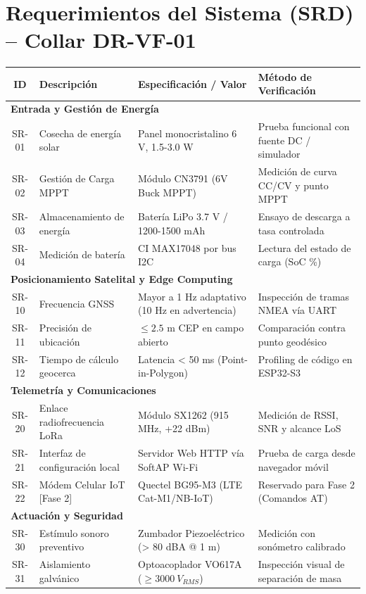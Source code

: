 \section*{Requerimientos del Sistema (SRD) -- Collar DR-VF-01}

\begin{table}[H]
\centering
\small
\begin{tabularx}{\textwidth}{|c X X X|}
\hline
\rowcolor{categorybg}
\textbf{ID} & \textbf{Descripción} & \textbf{Especificación / Valor} & \textbf{Método de Verificación} \\ \hline
\multicolumn{4}{|l|}{\cellcolor{categorybgsub}\textbf{Entrada y Gestión de Energía}} \\ \hline
SR-01 & Cosecha de energía solar & Panel monocristalino 6 V, 1.5-3.0 W & Prueba funcional con fuente DC / simulador \\ \hline
SR-02 & Gestión de Carga MPPT & Módulo CN3791 (6V Buck MPPT) & Medición de curva CC/CV y punto MPPT \\ \hline
SR-03 & Almacenamiento de energía & Batería LiPo 3.7 V / 1200-1500 mAh & Ensayo de descarga a tasa controlada \\ \hline
SR-04 & Medición de batería & CI MAX17048 por bus I2C & Lectura del estado de carga (SoC \%) \\ \hline
\multicolumn{4}{|l|}{\cellcolor{categorybgsub}\textbf{Posicionamiento Satelital y Edge Computing}} \\ \hline
SR-10 & Frecuencia GNSS & Mayor a 1 Hz adaptativo (10 Hz en advertencia) & Inspección de tramas NMEA vía UART \\ \hline
SR-11 & Precisión de ubicación & $\le 2.5$ m CEP en campo abierto & Comparación contra punto geodésico \\ \hline
SR-12 & Tiempo de cálculo geocerca & Latencia < 50 ms (Point-in-Polygon) & Profiling de código en ESP32-S3 \\ \hline
\multicolumn{4}{|l|}{\cellcolor{categorybgsub}\textbf{Telemetría y Comunicaciones}} \\ \hline
SR-20 & Enlace radiofrecuencia LoRa & Módulo SX1262 (915 MHz, +22 dBm) & Medición de RSSI, SNR y alcance LoS \\ \hline
SR-21 & Interfaz de configuración local & Servidor Web HTTP vía SoftAP Wi-Fi & Prueba de carga desde navegador móvil \\ \hline
SR-22 & Módem Celular IoT [Fase 2] & Quectel BG95-M3 (LTE Cat-M1/NB-IoT) & Reservado para Fase 2 (Comandos AT) \\ \hline
\multicolumn{4}{|l|}{\cellcolor{categorybgsub}\textbf{Actuación y Seguridad}} \\ \hline
SR-30 & Estímulo sonoro preventivo & Zumbador Piezoeléctrico (> 80 dBA @ 1 m) & Medición con sonómetro calibrado \\ \hline
SR-31 & Aislamiento galvánico & Optoacoplador VO617A ($\ge 3000~V_{RMS}$) & Inspección visual de separación de masa \\ \hline
\end{tabularx}
\end{table}